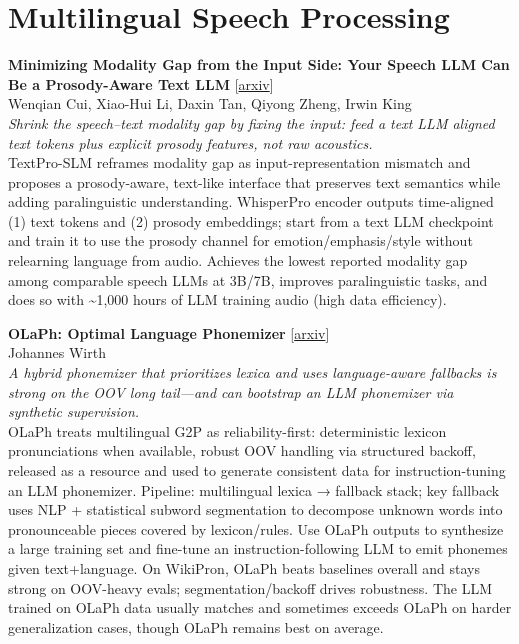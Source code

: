 \documentclass[12pt,letterpaper]{article}
\begin{document}
\medskip


\section*{Multilingual Speech Processing}

{\small\textbf{Minimizing Modality Gap from the Input Side: Your Speech LLM Can Be a Prosody-Aware Text LLM}} {\scriptsize[\href{https://arxiv.org/abs/2605.05927}{arxiv}]}\\
{\scriptsize Wenqian Cui, Xiao-Hui Li, Daxin Tan, Qiyong Zheng, Irwin King}\\

{\small\textit{Shrink the speech--text modality gap by fixing the input: feed a text LLM aligned text tokens plus explicit prosody features, not raw acoustics.}}\\[1pt]
{\footnotesize TextPro-SLM reframes modality gap as input-representation mismatch and proposes a prosody-aware, text-like interface that preserves text semantics while adding paralinguistic understanding. WhisperPro encoder outputs time-aligned (1) text tokens and (2) prosody embeddings; start from a text LLM checkpoint and train it to use the prosody channel for emotion/emphasis/style without relearning language from audio. Achieves the lowest reported modality gap among comparable speech LLMs at 3B/7B, improves paralinguistic tasks, and does so with \textasciitilde{}1,000 hours of LLM training audio (high data efficiency).}

\medskip

{\small\textbf{OLaPh: Optimal Language Phonemizer}} {\scriptsize[\href{https://arxiv.org/abs/2509.20086}{arxiv}]}\\
{\scriptsize Johannes Wirth}\\

{\small\textit{A hybrid phonemizer that prioritizes lexica and uses language-aware fallbacks is strong on the OOV long tail---and can bootstrap an LLM phonemizer via synthetic supervision.}}\\[1pt]
{\footnotesize OLaPh treats multilingual G2P as reliability-first: deterministic lexicon pronunciations when available, robust OOV handling via structured backoff, released as a resource and used to generate consistent data for instruction-tuning an LLM phonemizer. Pipeline: multilingual lexica → fallback stack; key fallback uses NLP + statistical subword segmentation to decompose unknown words into pronounceable pieces covered by lexicon/rules. Use OLaPh outputs to synthesize a large training set and fine-tune an instruction-following LLM to emit phonemes given text+language. On WikiPron, OLaPh beats baselines overall and stays strong on OOV-heavy evals; segmentation/backoff drives robustness. The LLM trained on OLaPh data usually matches and sometimes exceeds OLaPh on harder generalization cases, though OLaPh remains best on average.}
\end{document}
